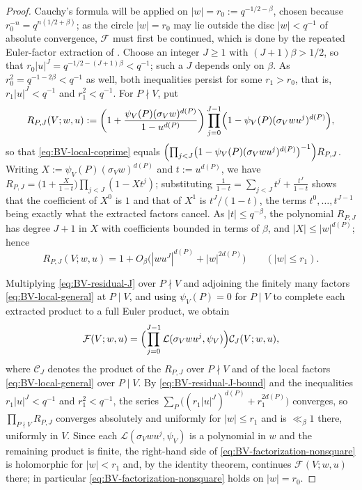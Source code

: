 \documentclass[a4paper,reqno]{amsart}
\numberwithin{equation}{section}
\theoremstyle{remark}
\theoremstyle{definition}
\begin{document}
\begin{proof}
Cauchy's formula will be applied on $|w|=r_0:=q^{-1/2-\beta}$, chosen because
$r_0^{-n}=q^{n(1/2+\beta)}$; as the circle $|w|=r_0$ may lie outside the disc
$|w|<q^{-1}$ of absolute convergence, $\mathcal F$ must first be continued,
which is done by the repeated Euler-factor extraction of
\cite[(7.3)]{Fl17-1}. Choose an integer $J\ge1$ with $(J+1)\beta>1/2$, so
that $r_0|u|^J=q^{-1/2-(J+1)\beta}<q^{-1}$; such a $J$ depends only on
$\beta$. As $r_0^2=q^{-1-2\beta}<q^{-1}$ as well, both inequalities persist
for some $r_1>r_0$, that is,
$r_1|u|^J<q^{-1}$ and $r_1^2<q^{-1}$. For $P\nmid V$, put
\begin{equation}\label{eq:BV-residual-J}
R_{P,J}(V;w,u):=
\left(1+\frac{\psi_V(P)(\sigma_Vw)^{d(P)}}{1-u^{d(P)}}\right)
\prod_{j=0}^{J-1}\Bigl(1-\psi_V(P)(\sigma_Vwu^j)^{d(P)}\Bigr),
\end{equation}
so that \eqref{eq:BV-local-coprime} equals
$\Bigl(\prod_{j<J}\bigl(1-\psi_V(P)(\sigma_Vwu^j)^{d(P)}\bigr)^{-1}\Bigr)R_{P,J}$.
Writing $X:=\psi_V(P)(\sigma_Vw)^{d(P)}$ and $t:=u^{d(P)}$, we have
$R_{P,J}=\bigl(1+\frac{X}{1-t}\bigr)\prod_{j<J}(1-Xt^j)$; substituting
$\frac1{1-t}=\sum_{j<J}t^j+\frac{t^J}{1-t}$ shows that the coefficient of
$X^0$ is $1$ and that of $X^1$ is $t^J/(1-t)$, the terms
$t^0,\dots,t^{J-1}$ being exactly what the extracted factors cancel. As
$|t|\le q^{-\beta}$, the polynomial $R_{P,J}$ has degree $J+1$ in $X$ with
coefficients bounded in terms of $\beta$, and $|X|\le|w|^{d(P)}$; hence
\begin{equation}\label{eq:BV-residual-J-bound}
R_{P,J}(V;w,u)=1+O_\beta\bigl(|wu^J|^{d(P)}+|w|^{2d(P)}\bigr)
\qquad(|w|\le r_1).
\end{equation}

Multiplying \eqref{eq:BV-residual-J} over $P\nmid V$ and adjoining the
finitely many factors \eqref{eq:BV-local-general} at $P\mid V$, and using
$\psi_V(P)=0$ for $P\mid V$ to complete each extracted product to a full
Euler product, we obtain
\begin{equation}\label{eq:BV-factorization-nonsquare}
\mathcal F(V;w,u)
=\Bigl(\prod_{j=0}^{J-1}\mathcal L(\sigma_Vwu^j,\psi_V)\Bigr)
 \mathcal C_J(V;w,u),
\end{equation}
where $\mathcal C_J$ denotes the product of the $R_{P,J}$ over $P\nmid V$
and of the local factors \eqref{eq:BV-local-general} over $P\mid V$. By
\eqref{eq:BV-residual-J-bound} and the inequalities $r_1|u|^J<q^{-1}$ and
$r_1^2<q^{-1}$, the series
$\sum_P\bigl((r_1|u|^J)^{d(P)}+r_1^{2d(P)}\bigr)$ converges, so
$\prod_{P\nmid V}R_{P,J}$ converges absolutely and uniformly for
$|w|\le r_1$ and is $\ll_\beta1$ there, uniformly in $V$. Since each
$\mathcal L(\sigma_Vwu^j,\psi_V)$ is a polynomial in $w$ and the remaining
product is finite, the right-hand side of
\eqref{eq:BV-factorization-nonsquare} is holomorphic for $|w|<r_1$ and, by
the identity theorem, continues $\mathcal F(V;w,u)$ there; in particular
\eqref{eq:BV-factorization-nonsquare} holds on $|w|=r_0$.


\end{proof}
\end{document}
